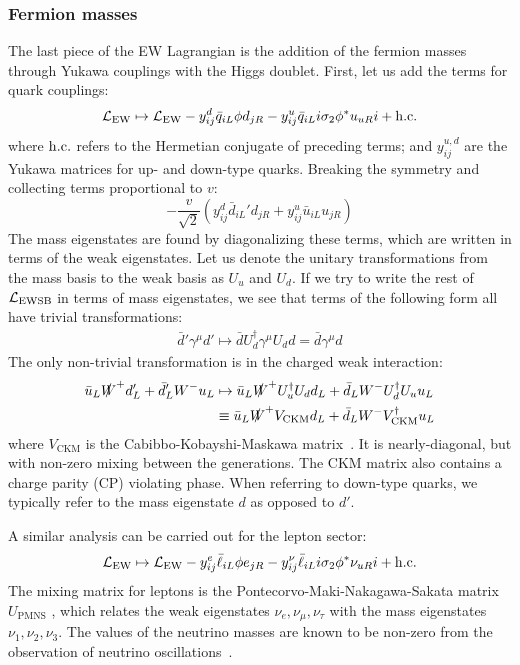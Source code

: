 \subsubsection{Fermion masses}
The last piece of the EW Lagrangian is the addition of the fermion masses through Yukawa couplings with the Higgs doublet. 
First, let us add the terms for quark couplings:
\begin{equation}
   \mathcal{L}_\mathrm{EW} \mapsto \mathcal{L}_\mathrm{EW} - y_{ij}^d \bar q_{iL} \phi d_{jR} - y_{ij}^u \bar q_{iL}i\sigma_2 \phi^* u_{uR}i + \mathrm{h.c.}
\end{equation}
where ${\mathrm{h.c.}}$ refers to the Hermetian conjugate of preceding terms; and ${y_{ij}^{u,d}}$ are the Yukawa matrices for up- and down-type quarks.
Breaking the symmetry and collecting terms proportional to ${v}$:
\begin{equation}
    -\frac{v}{\sqrt{2}}\left(y_{ij}^d \bar d_{iL}' d_{jR} + y_{ij}^u \bar u_{iL} u_{jR}\right) 
\end{equation}
The mass eigenstates are found by diagonalizing these terms, which are written in terms of the weak eigenstates.
Let us denote the unitary transformations from the mass basis to the weak basis as ${U_u}$ and ${U_d}$. 
If we try to write the rest of ${\mathcal{L}_\mathrm{EWSB}}$ in terms of mass eigenstates, we see that terms of the following form all have trivial transformations:
\begin{gather} 
\bar d' \gamma^\mu d' \mapsto \bar d U_d^\dag \gamma^\mu U_d d = \bar d \gamma^\mu d
\end{gather}
The only non-trivial transformation is in the charged weak interaction:
\begin{align} 
\bar u_L \slashed W^+ d'_L + \bar d'_L W^- u_L &\mapsto 
    \bar u_L \slashed W^+ U_u^\dag U_d d_L + \bar d_L W^- U_d^\dag U_u u_L \nonumber \\
    &\equiv \bar u_L \slashed W^+ V_\mathrm{CKM} d_L + \bar d_L W^- V^\dag_\mathrm{CKM} u_L
\end{align}
where ${V_\mathrm{CKM}}$ is the Cabibbo-Kobayshi-Maskawa matrix~\cite{ckm1,ckm2}.
It is nearly-diagonal, but with non-zero mixing between the generations. 
The CKM matrix also contains a charge parity (CP) violating phase.
When referring to down-type quarks, we typically refer to the mass eigenstate ${d}$ as opposed to ${d'}$.

A similar analysis can be carried out for the lepton sector:
\begin{equation}
   \mathcal{L}_\mathrm{EW} \mapsto \mathcal{L}_\mathrm{EW} - y_{ij}^e \bar \ell_{iL} \phi e_{jR} - y_{ij}^\nu \bar \ell_{iL}i\sigma_2 \phi^* \nu_{uR}i + \mathrm{h.c.}
\end{equation}
The mixing matrix for leptons is the Pontecorvo-Maki-Nakagawa-Sakata matrix ${U_\mathrm{PMNS}}$ \cite{pmns}, which relates the weak eigenstates ${\nu_e, \nu_\mu,\nu_\tau}$ with the mass eigenstates ${\nu_1,\nu_2,\nu_3}$.
The values of the neutrino masses are known to be non-zero from the observation of neutrino oscillations~\cite{nuosc}.

